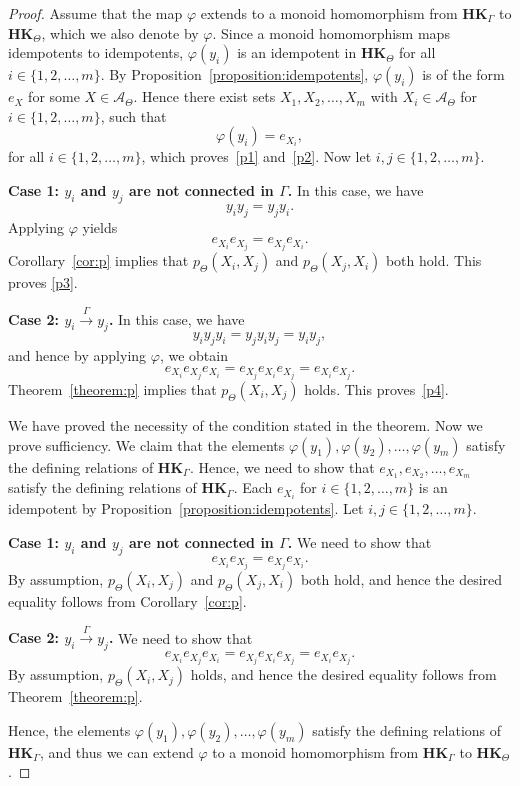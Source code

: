 \documentclass[pdflatex,sn-mathphys-num]{sn-jnl}
\newcommand{\hk}{\mathbf{HK}_{\Theta}}
\newcommand{\hkg}{\mathbf{HK}_{\Gamma}}
\newcommand{\vp}{\varphi}
\newcommand{\tog}{\overset{\Gamma}{\to}}
\theoremstyle{definition}
\theoremstyle{remark}
\begin{document}
\begin{proof}
    Assume that the map $\vp$ extends to a monoid homomorphism from $\hkg$ to $\hk$, which we also denote by $\vp$.
    Since a monoid homomorphism maps idempotents to idempotents, $\vp(y_i)$ is an idempotent in $\hk$ for all $i \in \{1, 2, \dots, m\}$.
    By Proposition~\ref{proposition:idempotents}, $\vp(y_i)$ is of the form $e_X$ for some $X \in \mathcal{A}_{\Theta}$.
    Hence there exist sets $X_1, X_2, \dots, X_m$ with $X_i \in \mathcal{A}_{\Theta}$ for $i \in \{1, 2, \dots, m\}$, such that 
    \[
    \vp(y_i) = e_{X_i},
    \]
    for all $i \in \{1, 2, \dots, m\}$, which proves~\eqref{p1} and~\eqref{p2}.
    Now let $i, j \in \{1, 2, \dots, m\}$.
    
    \textbf{Case 1: $y_i$ and $y_j$ are not connected in $\Gamma$.}
    In this case, we have 
    \[
    y_i y_j = y_j y_i.
    \]
    Applying $\vp$ yields
    \[
    e_{X_i} e_{X_j} = e_{X_j} e_{X_i}.
    \]
    Corollary~\ref{cor:p} implies that $p_{\Theta}(X_i, X_j)$ and $p_{\Theta}(X_j, X_i)$ both hold. 
    This proves \eqref{p3}.
    
    
    \textbf{Case 2: $y_i \tog y_j$.}
    In this case, we have
    \[
    y_i y_j y_i = y_j y_i y_j = y_i y_j,
    \]
    and hence by applying $\vp$, we obtain
    \[
    e_{X_i} e_{X_j} e_{X_i} = e_{X_j} e_{X_i} e_{X_j} = e_{X_i} e_{X_j}.
    \]
    Theorem~\ref{theorem:p} implies that $p_{\Theta}(X_i, X_j)$ holds.
    This proves~\eqref{p4}.

    We have proved the necessity of the condition stated in the theorem.
    Now we prove sufficiency.
    We claim that the elements $\vp(y_1), \vp(y_2), \dots, \vp(y_m)$ satisfy the defining relations of $\hkg$.
    Hence, we need to show that $e_{X_1}, e_{X_2}, \dots, e_{X_m}$ satisfy the defining relations of $\hkg$.
    Each $e_{X_i}$ for $i \in \{1, 2, \dots, m\}$ is an idempotent by Proposition~\ref{proposition:idempotents}.
    Let $i, j \in \{1, 2, \dots, m\}$.

    \textbf{Case 1: $y_i$ and $y_j$ are not connected in $\Gamma$.}
    We need to show that
    \[
    e_{X_i} e_{X_j} = e_{X_j} e_{X_i}.
    \]
    By assumption, $p_{\Theta}(X_i, X_j)$ and $p_{\Theta}(X_j, X_i)$ both hold, and hence the 
    desired equality follows from Corollary~\ref{cor:p}.
    
    \textbf{Case 2: $y_i \tog y_j$.}
    We need to show that
    \[
    e_{X_i} e_{X_j} e_{X_i} = e_{X_j} e_{X_i} e_{X_j} = e_{X_i} e_{X_j}.
    \]
    By assumption, $p_{\Theta}(X_i, X_j)$ holds, and hence the desired equality follows from 
    Theorem~\ref{theorem:p}.
     
    Hence, the elements $\vp(y_1), \vp(y_2), \dots, \vp(y_m)$ satisfy the defining relations of $\hkg$, and thus we can extend $\vp$ to a monoid homomorphism from $\hkg$ to $\hk$.
\end{proof}
\end{document}
